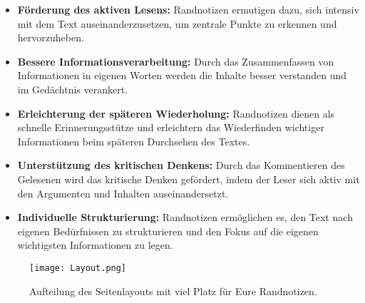 \documentclass[11pt,a4paper]{book}
\begin{document}
\begin{itemize}
\item \textbf{F\"{o}rderung des aktiven Lesens:} Randnotizen ermutigen dazu, sich intensiv mit dem Text auseinanderzusetzen, um zentrale Punkte zu erkennen und hervorzuheben.

\item \textbf{Bessere Informationsverarbeitung:} Durch das Zusammenfassen von Informationen in eigenen Worten werden die Inhalte besser verstanden und im Ged\"{a}chtnis verankert.

\item \textbf{Erleichterung der sp\"{a}teren Wiederholung:} Randnotizen dienen als schnelle Erinnerungsst\"{u}tze und erleichtern das Wiederfinden wichtiger Informationen beim sp\"{a}teren Durchsehen des Textes.

\item \textbf{Unterst\"{u}tzung des kritischen Denkens:} Durch das Kommentieren des Gelesenen wird das kritische Denken gef\"{o}rdert, indem der Leser sich aktiv mit den Argumenten und Inhalten auseinandersetzt.

\item \textbf{Individuelle Strukturierung:} Randnotizen erm\"{o}glichen es, den Text nach eigenen Bed\"{u}rfnissen zu strukturieren und den Fokus auf die eigenen wichtigsten Informationen zu legen.
\end{itemize}

\vs{1cm}
\begin{figure}[h]
	\centering
	\texttt{[image: Layout.png]}
	\caption{Aufteilung des Seitenlayouts mit viel Platz f\"{u}r Eure Randnotizen.}
	\label{fig:Seitenlayout}
\end{figure}


\tableofcontents
\newpage

\restoregeometry %




















\printbibliography
\end{document}
